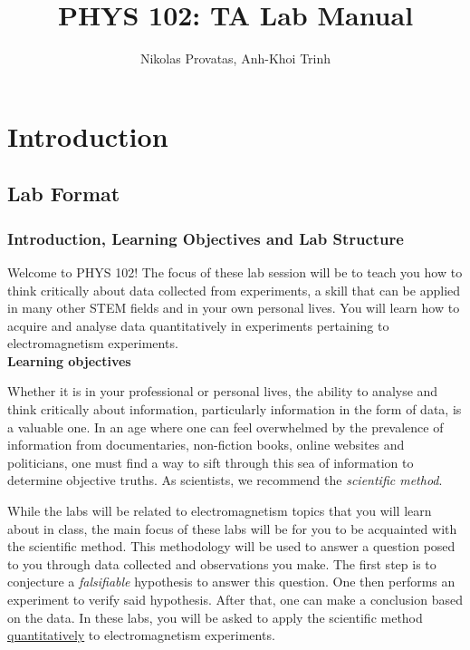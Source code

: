 \documentclass[12pt]{report}
\title{PHYS 102: TA Lab Manual}
\author{Nikolas Provatas, Anh-Khoi Trinh}
\begin{document}
\maketitle

\tableofcontents

{}
\part*{Introduction} \label{Sec:Intro}

{}
\chapter*{Lab Format}

{}
\section*{Introduction, Learning Objectives and Lab Structure}
Welcome to PHYS 102! The focus of these lab session will be to teach you how to think critically about  data collected from experiments, a skill that can be applied in many other STEM fields and in your own personal lives. You will learn how to acquire and analyse data quantitatively in experiments pertaining to electromagnetism experiments. \\

\noindent \large \textbf{Learning objectives} \normalsize

Whether it is in your professional or personal lives, the ability to analyse and think critically about information, particularly information in the form of data, is a valuable one. In an age where one can feel overwhelmed by the prevalence of information from documentaries, non-fiction books, online websites and politicians, one must find a way to sift through this sea of information to determine objective truths. As scientists, we recommend the \textit{scientific method}.

While the labs will be related to electromagnetism topics that you will learn about in class, the main focus of these labs will be for you to be acquainted with the scientific method. This methodology will be used to answer a question posed to you through data collected and observations you make. The first step is to conjecture a \textit{falsifiable} hypothesis to answer this question. One then performs an experiment to verify said hypothesis. After that, one can make a conclusion based on the data. In these labs, you will be asked to apply the scientific method \underline{quantitatively} to electromagnetism experiments. \\
\end{document}
